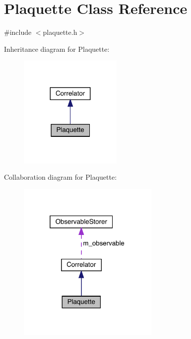 \hypertarget{class_plaquette}{}\section{Plaquette Class Reference}
\label{class_plaquette}


{\ttfamily \#include $<$plaquette.\+h$>$}



Inheritance diagram for Plaquette\+:\nopagebreak
\begin{figure}[H]
\begin{center}
\leavevmode
\includegraphics[width=140pt]{class_plaquette__inherit__graph}
\end{center}
\end{figure}


Collaboration diagram for Plaquette\+:\nopagebreak
\begin{figure}[H]
\begin{center}
\leavevmode
\includegraphics[width=193pt]{class_plaquette__coll__graph}
\end{center}
\end{figure}

